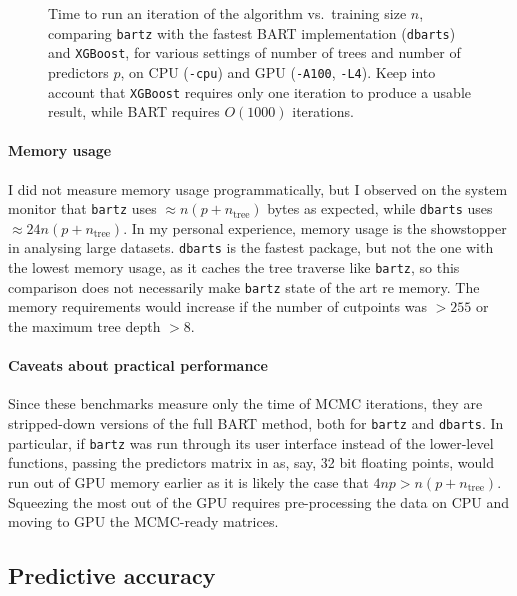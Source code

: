 \documentclass{article}
\newcommand{\widecenter}[1]{\noindent\hspace{-\textwidth}\makebox[3\textwidth][c]{#1}}
\newcommand{\includempl}[1]{\texttt{[image: \#1]}}
\let\oldmarginpar\marginpar
\renewcommand{\marginpar}[1]{\oldmarginpar{\sffamily\scriptsize #1}}
\renewcommand{\marginpar}[1]{\relax} %
\begin{document}
    \begin{figure}
        \widecenter{\includempl{time-all}}
        \caption{\label{fig:time-all} Time to run an iteration of the algorithm vs.\ training size $n$, comparing \texttt{bartz} with the fastest BART implementation (\texttt{dbarts}) and \texttt{XGBoost}, for various settings of number of trees and number of predictors $p$, on CPU (\texttt{-cpu}) and GPU (\texttt{-A100}, \texttt{-L4}). Keep into account that \texttt{XGBoost} requires only one iteration to produce a usable result, while BART requires $O(1000)$ iterations.}
    \end{figure}

    \paragraph{Memory usage}

    I did not measure memory usage programmatically, but I observed on the system monitor that \texttt{bartz} uses $\approx n(p+n_\text{tree})$ bytes as expected, while \texttt{dbarts} uses $\approx 24 n(p+n_\text{tree})$. In my personal experience, memory usage is the showstopper in analysing large datasets.\marginpar{someone in the literature said the same, but I can't remember who} \texttt{dbarts} is the fastest package, but not the one with the lowest memory usage, as it caches the tree traverse like \texttt{bartz}, so this comparison does not necessarily make \texttt{bartz} state of the art re memory. The memory requirements would increase if the number of cutpoints was $>255$ or the maximum tree depth $>8$.

    \paragraph{Caveats about practical performance}

    Since these benchmarks measure only the time of MCMC iterations, they are stripped-down versions of the full BART method, both for \texttt{bartz} and \texttt{dbarts}. In particular, if \texttt{bartz} was run through its user interface instead of the lower-level functions, passing the predictors matrix in as, say, 32 bit floating points, would run out of GPU memory earlier as it is likely the case that $4np > n(p+n_\text{tree})$. Squeezing the most out of the GPU requires pre-processing the data on CPU and moving to GPU the MCMC-ready matrices.

    \subsection{Predictive accuracy}
    \label{sec:pred}
\end{document}
